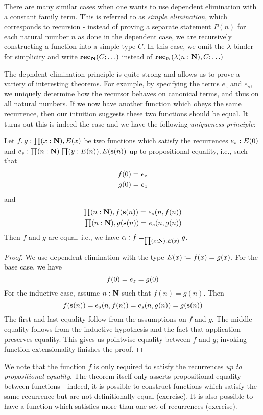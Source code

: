 There are many similar cases when one wants to use dependent elimination with a constant family term. This is referred to as \emph{simple elimination}, which corresponds to recursion - instead of proving a separate statement $P(n)$ for each natural number $n$ as done in the dependent case, we are recursively constructing a function into a simple type $C$. In this case, we omit the $\lambda$-binder for simplicity and write $\mathbf{rec}_\mathbf{N}(C; \ldots)$ instead of $\mathbf{rec}_\mathbf{N}(\lambda (n : \mathbf{N}), C; \ldots)$

The depndent elimination principle is quite strong and allows us to prove a variety of interesting theorems. For example, by specifying the terms $e_z$ and $e_s$, we  uniquely determine how the recursor behaves on canonical terms, and thus on all natural numbers. If we now have another function which obeys the same recurrence, then our intuition suggests these two functions should be equal. It turns out this is indeed the case and we have the following \emph{uniqueness principle}:

\begin{thm}
Let $f,g : \prd{x:\nat} E(x)$ be two functions which satisfy the recurrences $e_z : E(0)$ and $e_s : \prd{n : \nat}{y : E(n)} E(\s(n))$ up to propositional equality, i.e., such that
\begin{align*}
f(0) =_{} e_z \\ 
g(0) =_{} e_z
\end{align*}
and 
\begin{align*}
\prd{n : \nat} \id{f(\s(n))}{e_s(n, f(n))} \\
\prd{n : \nat} \id{g(\s(n))}{e_s(n, g(n))}
\end{align*}
Then $f$ and $g$ are equal, i.e., we have $\alpha : \id[\prd{x :\nat} E(x)]{f}{g}$. 
\end{thm}

\begin{proof}
We use dependent elimination with the type $E(x) \coloneqq f(x) =_{} g(x)$. For the base case, we have \[f(0) = e_z = g(0)\]
For the inductive case, assume $n : \mathbf{N}$ such that $f(n) = g(n)$. Then
\[ f(\mathbf{s}(n)) = e_s(n, f(n)) = e_s(n, g(n)) = g(\mathbf{s}(n)) \]
The first and last equality follow from the assumptions on $f$ and $g$. The middle equality follows from the inductive hypothesis and the fact that application preserves equality. This gives us pointwise equality between $f$ and $g$; invoking function extensionality finishes the proof.
\end{proof}
We note that the function $f$ is only required to satisfy the recurrences \emph{up to propositional equality}. The theorem itself only asserts propositional equality between functions - indeed, it is possible to construct functions which satisfy the same recurrence but are not definitionally equal (exercise). It is also possible to have a function which satisfies more than one set of recurrences (exercise).

